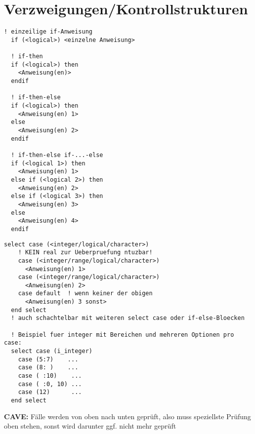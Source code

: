 \documentclass[a4paper, twocolumn]{scrarticle}
\begin{document}
\section{Verzweigungen/Kontrollstrukturen}
\begin{lstlisting}[caption={\bfseries Verzweigungen mit if}]
  ! einzeilige if-Anweisung
  if (<logical>) <einzelne Anweisung>
 
  ! if-then
  if (<logical>) then
    <Anweisung(en)>
  endif
  
  ! if-then-else
  if (<logical>) then
    <Anweisung(en) 1>
  else
    <Anweisung(en) 2>
  endif
  
  ! if-then-else if-...-else
  if (<logical 1>) then
    <Anweisung(en) 1>
  else if (<logical 2>) then
    <Anweisung(en) 2>
  else if (<logical 3>) then
    <Anweisung(en) 3>
  else
    <Anweisung(en) 4>
  endif
\end{lstlisting}
\begin{lstlisting}[caption={\bfseries Verzweigungen mit select case (um weit verzweigte if-else-Strukturen zu vermeiden)}]
  select case (<integer/logical/character>)
    ! KEIN real zur Ueberpruefung ntuzbar!
    case (<integer/range/logical/character>)
	  <Anweisung(en) 1>
	case (<integer/range/logical/character>)
	  <Anweisung(en) 2>
	case default  ! wenn keiner der obigen
	  <Anweisung(en) 3 sonst>
  end select
  ! auch schachtelbar mit weiteren select case oder if-else-Bloecken
	
  ! Beispiel fuer integer mit Bereichen und mehreren Optionen pro case:
  select case (i_integer)
	case (5:7)    ...
	case (8: )    ...
	case ( :10)    ...
	case ( :0, 10) ...		
	case (12)      ...
  end select
\end{lstlisting}
\textbf{CAVE:} Fälle werden von oben nach unten geprüft, also muss speziellste Prüfung oben stehen, sonst wird darunter ggf. nicht mehr geprüft
\end{document}
